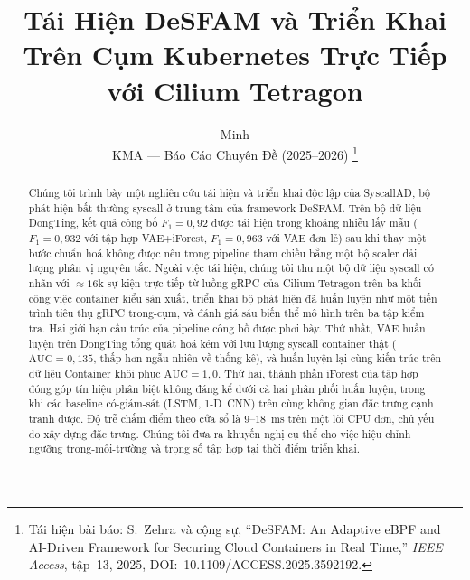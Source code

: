\documentclass[journal,10pt,twoside]{IEEEtran}
\begin{document}
\title{Tái Hiện DeSFAM và Triển Khai Trên Cụm Kubernetes Trực Tiếp với Cilium Tetragon}

\author{Minh \\ KMA --- Báo Cáo Chuyên Đề (2025--2026)
\thanks{Tái hiện bài báo: S.~Zehra và cộng sự,
``DeSFAM: An Adaptive eBPF and AI-Driven Framework for Securing Cloud
Containers in Real Time,'' \textit{IEEE Access}, tập~13, 2025,
DOI:~10.1109/ACCESS.2025.3592192.}}

\maketitle

\begin{abstract}
Chúng tôi trình bày một nghiên cứu tái hiện và triển khai độc lập của
SyscallAD, bộ phát hiện bất thường syscall ở trung tâm của framework
DeSFAM. Trên bộ dữ liệu DongTing, kết quả công bố $F_{1}=0{,}92$ được
tái hiện trong khoảng nhiễu lấy mẫu ($F_{1}=0{,}932$ với tập hợp
VAE+iForest, $F_{1}=0{,}963$ với VAE đơn lẻ) sau khi thay một bước
chuẩn hoá không được nêu trong pipeline tham chiếu bằng một bộ scaler
dải lượng phân vị nguyên tắc. Ngoài việc tái hiện, chúng tôi thu một
bộ dữ liệu syscall có nhãn với $\approx\!16$k sự kiện trực tiếp từ
luồng gRPC của Cilium Tetragon trên ba khối công việc container kiểu
sản xuất, triển khai bộ phát hiện đã huấn luyện như một tiến trình
tiêu thụ gRPC trong-cụm, và đánh giá sáu biến thể mô hình trên ba tập
kiểm tra. Hai giới hạn cấu trúc của pipeline công bố được phơi bày.
Thứ nhất, VAE huấn luyện trên DongTing tổng quát hoá kém với lưu
lượng syscall container thật ($\text{AUC}=0{,}135$, thấp hơn ngẫu
nhiên về thống kê), và huấn luyện lại cùng kiến trúc trên dữ liệu
Container khôi phục $\text{AUC}=1{,}0$. Thứ hai, thành phần iForest
của tập hợp đóng góp tín hiệu phân biệt không đáng kể dưới cả hai
phân phối huấn luyện, trong khi các baseline có-giám-sát (LSTM,
1-D~CNN) trên cùng không gian đặc trưng cạnh tranh được. Độ trễ chấm
điểm theo cửa sổ là $9$--$18$~ms trên một lõi CPU đơn, chủ yếu do xây
dựng đặc trưng. Chúng tôi đưa ra khuyến nghị cụ thể cho việc hiệu
chỉnh ngưỡng trong-môi-trường và trọng số tập hợp tại thời điểm triển
khai.
\end{abstract}





\end{document}

